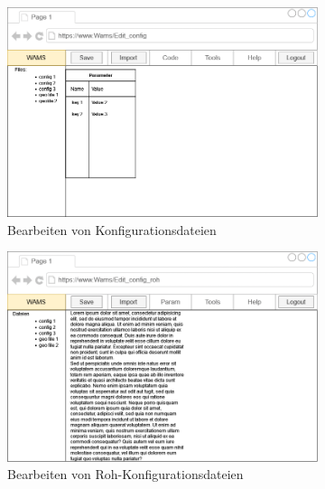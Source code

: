 \begin{figure}[ht]
    \centering
    \begin{subfigure}{.75\textwidth}
        \centering
        \includegraphics[width = \textwidth]{Grafiken/Gui Mockups/workflowGui-ConfigEdit.drawio.png}
    \caption{Bearbeiten von Konfigurationsdateien}
    \label{fig: sfigKonfig}
    \end{subfigure}
   \begin{subfigure}{.75\textwidth}
    \centering
    \includegraphics[width = \textwidth]{Grafiken/Gui Mockups/workflowGui-ConfigEditRohdata.drawio.png}
    \caption{Bearbeiten von Roh-Konfigurationsdateien}
    \label{fig:sfigRawConfig}
   \end{subfigure}
   \begin{subfigure}{.75\textwidth}
        \centering

\end{subfigure}
\end{figure}
